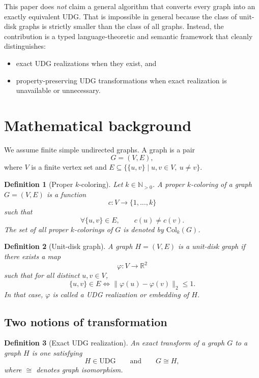 \documentclass[11pt]{article}
\newtheorem{definition}{Definition}
\newcommand{\UDG}{\mathrm{UDG}}
\newcommand{\Col}{\mathrm{Col}}
\newcommand{\Real}{\mathbb{R}}
\newcommand{\Nat}{\mathbb{N}}
\begin{document}
This paper does \emph{not} claim a general algorithm that converts every graph into an exactly equivalent UDG. That is impossible in general because the class of unit-disk graphs is strictly smaller than the class of all graphs. Instead, the contribution is a typed language-theoretic and semantic framework that cleanly distinguishes:
\begin{itemize}
    \item exact UDG realizations when they exist, and
    \item property-preserving UDG transformations when exact realization is unavailable or unnecessary.
\end{itemize}

\section{Mathematical background}

We assume finite simple undirected graphs. A graph is a pair
\[
G = (V,E),
\]
where $V$ is a finite vertex set and $E \subseteq \{\{u,v\} \mid u,v\in V,\ u\neq v\}$.

\begin{definition}[Proper $k$-coloring]
Let $k\in\Nat_{>0}$. A proper $k$-coloring of a graph $G=(V,E)$ is a function
\[
c:V\to \{1,\dots,k\}
\]
such that
\[
\forall \{u,v\}\in E,\qquad c(u)\neq c(v).
\]
The set of all proper $k$-colorings of $G$ is denoted by $\Col_k(G)$.
\end{definition}

\begin{definition}[Unit-disk graph]
A graph $H=(V,E)$ is a unit-disk graph if there exists a map
\[
\varphi:V\to \Real^2
\]
such that for all distinct $u,v\in V$,
\[
\{u,v\}\in E
\iff
\|\varphi(u)-\varphi(v)\|_2 \le 1.
\]
In that case, $\varphi$ is called a \emph{UDG realization} or \emph{embedding} of $H$.
\end{definition}

\subsection{Two notions of transformation}

\begin{definition}[Exact UDG realization]
An exact transform of a graph $G$ to a graph $H$ is one satisfying
\[
H\in \UDG
\qquad\text{and}\qquad
G\cong H,
\]
where $\cong$ denotes graph isomorphism.
\end{definition}
\end{document}
